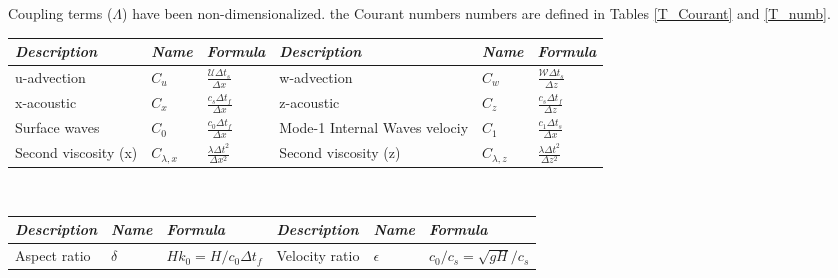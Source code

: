 \documentclass[a4paper,11pt]{article}
\begin{document}
\begin{itemize}[label=\textbullet,font=\tiny]
   
    Coupling terms ($\Lambda$) have been non-dimensionalized. the Courant numbers numbers 
    are defined in Tables \ref{T_Courant} and \ref{T_numb}.\\
    
    {\renewcommand{\arraystretch}{2}
    \begin{tabular}{|l|l|l|l|l|l|}
     \hline
     \textit{Description} & \textit{Name} & \textit{Formula} &
     \textit{Description} & \textit{Name} & \textit{Formula} \\
     \hline
     u-advection   & $C_u$ & $\frac{\mathcal{U}\Delta{t_s}}{\Delta{x}}$ &
     w-advection   & $C_w$ & $\frac{\mathcal{W}\Delta{t_s}}{\Delta{z}}$ \\
     x-acoustic    & $C_x$ & $\frac{c_s\Delta{t_f}}{\Delta{x}}$ &
     z-acoustic    & $C_z$ & $\frac{c_s\Delta{t_f}}{\Delta{z}}$\\
     Surface waves & $C_0$ & $\frac{c_0\Delta t_f}{\Delta x}$ &
     Mode-1 Internal 
     Waves velociy & $C_1$ & $\frac{c_1\Delta{t_s}}{\Delta{x}}$ \\
     Second viscosity (x) & $C_{\lambda,x}$ & $\frac{\lambda \Delta t^2}{\Delta x^2}$ &
     Second viscosity (z) & $C_{\lambda,z}$& $\frac{\lambda \Delta t^2}{\Delta z^2}$ \\
     \hline
    \end{tabular}}\\
    \label{T_Courant}

    {\renewcommand{\arraystretch}{2}
    \begin{tabular}{|l|l|l|l|l|l|}
     \hline
     \textit{Description} & \textit{Name} & \textit{Formula} &
     \textit{Description} & \textit{Name} & \textit{Formula} \\
     \hline
     Aspect ratio         & $\delta$   & $H k_0=H/c_0\Delta t_f$                &
     Velocity ratio       & $\epsilon$ & $c_0/c_s=\sqrt{gH}/c_s$  \\
     \hline
    \end{tabular}} \\
    \label{T_numb}


\end{itemize}
\end{document}
